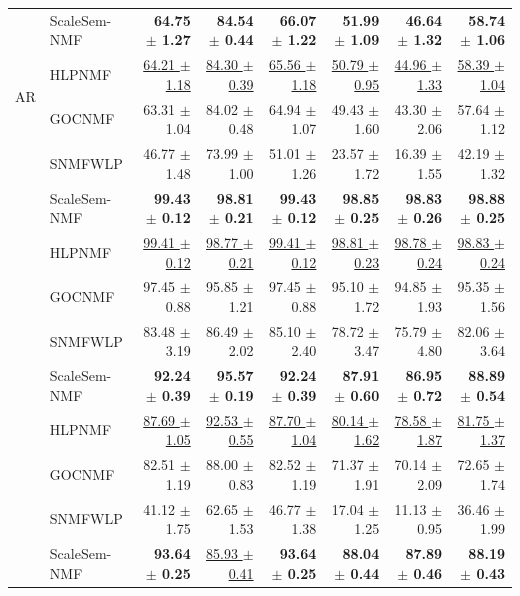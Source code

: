 \begin{tabular}{llrrrrrr}
\multirow{4}{*}{AR} & ScaleSem-NMF & \textbf{64.75 $\pm$ 1.27} & \textbf{84.54 $\pm$ 0.44} & \textbf{66.07 $\pm$ 1.22} & \textbf{51.99 $\pm$ 1.09} & \textbf{46.64 $\pm$ 1.32} & \textbf{58.74 $\pm$ 1.06} \\
 & HLPNMF & \underline{64.21 $\pm$ 1.18} & \underline{84.30 $\pm$ 0.39} & \underline{65.56 $\pm$ 1.18} & \underline{50.79 $\pm$ 0.95} & \underline{44.96 $\pm$ 1.33} & \underline{58.39 $\pm$ 1.04} \\
 & GOCNMF & 63.31 $\pm$ 1.04 & 84.02 $\pm$ 0.48 & 64.94 $\pm$ 1.07 & 49.43 $\pm$ 1.60 & 43.30 $\pm$ 2.06 & 57.64 $\pm$ 1.12 \\
 & SNMFWLP & 46.77 $\pm$ 1.48 & 73.99 $\pm$ 1.00 & 51.01 $\pm$ 1.26 & 23.57 $\pm$ 1.72 & 16.39 $\pm$ 1.55 & 42.19 $\pm$ 1.32 \\
\addlinespace
\multirow{4}{*}{MSRA25} & ScaleSem-NMF & \textbf{99.43 $\pm$ 0.12} & \textbf{98.81 $\pm$ 0.21} & \textbf{99.43 $\pm$ 0.12} & \textbf{98.85 $\pm$ 0.25} & \textbf{98.83 $\pm$ 0.26} & \textbf{98.88 $\pm$ 0.25} \\
 & HLPNMF & \underline{99.41 $\pm$ 0.12} & \underline{98.77 $\pm$ 0.21} & \underline{99.41 $\pm$ 0.12} & \underline{98.81 $\pm$ 0.23} & \underline{98.78 $\pm$ 0.24} & \underline{98.83 $\pm$ 0.24} \\
 & GOCNMF & 97.45 $\pm$ 0.88 & 95.85 $\pm$ 1.21 & 97.45 $\pm$ 0.88 & 95.10 $\pm$ 1.72 & 94.85 $\pm$ 1.93 & 95.35 $\pm$ 1.56 \\
 & SNMFWLP & 83.48 $\pm$ 3.19 & 86.49 $\pm$ 2.02 & 85.10 $\pm$ 2.40 & 78.72 $\pm$ 3.47 & 75.79 $\pm$ 4.80 & 82.06 $\pm$ 3.64 \\
\addlinespace
\multirow{4}{*}{COIL100} & ScaleSem-NMF & \textbf{92.24 $\pm$ 0.39} & \textbf{95.57 $\pm$ 0.19} & \textbf{92.24 $\pm$ 0.39} & \textbf{87.91 $\pm$ 0.60} & \textbf{86.95 $\pm$ 0.72} & \textbf{88.89 $\pm$ 0.54} \\
 & HLPNMF & \underline{87.69 $\pm$ 1.05} & \underline{92.53 $\pm$ 0.55} & \underline{87.70 $\pm$ 1.04} & \underline{80.14 $\pm$ 1.62} & \underline{78.58 $\pm$ 1.87} & \underline{81.75 $\pm$ 1.37} \\
 & GOCNMF & 82.51 $\pm$ 1.19 & 88.00 $\pm$ 0.83 & 82.52 $\pm$ 1.19 & 71.37 $\pm$ 1.91 & 70.14 $\pm$ 2.09 & 72.65 $\pm$ 1.74 \\
 & SNMFWLP & 41.12 $\pm$ 1.75 & 62.65 $\pm$ 1.53 & 46.77 $\pm$ 1.38 & 17.04 $\pm$ 1.25 & 11.13 $\pm$ 0.95 & 36.46 $\pm$ 1.99 \\
\addlinespace
\multirow{4}{*}{MNIST} & ScaleSem-NMF & \textbf{93.64 $\pm$ 0.25} & \underline{85.93 $\pm$ 0.41} & \textbf{93.64 $\pm$ 0.25} & \textbf{88.04 $\pm$ 0.44} & \textbf{87.89 $\pm$ 0.46} & \textbf{88.19 $\pm$ 0.43} \\

\end{tabular}

